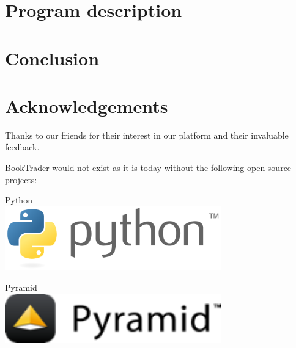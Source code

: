 \documentclass[11pt,a4paper]{article}
\begin{document}
\section{Program description}






\section{Conclusion}




\section{Acknowledgements}


Thanks to our friends for their interest in our platform and
their invaluable feedback.

\vspace{0.5cm}

BookTrader would not exist as it is today without the following
open source projects:

\vspace{0.2cm}


\hspace{0.025\linewidth}
\begin{minipage}[b]{0.45\linewidth}
  Python\\
  \includegraphics[width=0.7\textwidth]{graphics/python-logo-generic.png}
\end{minipage}
\hspace{0.05\linewidth}
\begin{minipage}[b]{0.45\linewidth}
  Pyramid\\
  \includegraphics[width=0.7\textwidth]{graphics/pyramid-small-whitebg.png}
\end{minipage}
\end{document}
